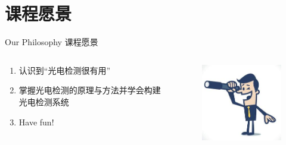 \documentclass[10pt]{beamer}
\begin{document}
\section{课程愿景}
\begin{frame}{Our Philosophy}
课程愿景
      \begin{columns}
        \begin{column}{0.6\textwidth}
        
        \begin{enumerate}[(1)]
    \item<2-| alert@2>认识到“光电检测很有用”
    \item<2-| alert@3>掌握光电检测的原理与方法并学会构建光电检测系统
    \item<2-| alert@4>Have fun!
    
    \end{enumerate}
        \end{column}
        \begin{column}{0.4\textwidth}
        \begin{figure}[htbp] 
        \centering\includegraphics[width=2.0in]{source/intro11.jpg} 
        \end{figure} 
        
        \end{column}
        \end{columns}
    
    
    
\end{frame}

\end{document}
